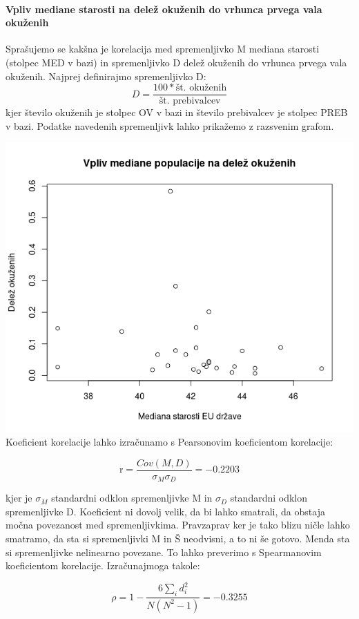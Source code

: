 \documentclass[a4paper,11pt]{article}
\begin{document}
\paragraph{Vpliv mediane starosti na delež okuženih do vrhunca prvega vala okuženih}
Sprašujemo se kakšna je korelacija med spremenljivko M mediana starosti (stolpec MED v bazi) in spremenljivko D delež okuženih do vrhunca prvega vala okuženih. Najprej definirajmo spremenljivko D:
\[D = \frac{100 * \text{št. okuženih}}{\text{št. prebivalcev}}\]
kjer število okuženih je stolpec OV v bazi in število prebivalcev je stolpec PREB v bazi. Podatke navedenih spremenljivk lahko prikažemo z razsvenim grafom.

\includegraphics[scale=0.6]{vpliv_med_pop_na_delez_okuzencev}
Koeficient korelacije lahko izračunamo s Pearsonovim koeficientom korelacije:

\begin{center}
\[\text{r} = \frac{Cov(M,D)}{\sigma_{M} \sigma_{D}} = -0.2203\]
\end{center} 
kjer je \(\sigma_{M}\) standardni odklon spremenljivke M in \(\sigma_{D}\) standardni odklon spremenljivke D. Koeficient ni dovolj velik, da bi lahko smatrali, da obstaja močna povezanost med spremenljivkima. Pravzaprav ker je tako blizu ničle lahko smatramo, da sta si spremenljivki M in Š neodvisni, a to ni še gotovo. Menda sta si spremenljivke nelinearno povezane. To lahko preverimo s Spearmanovim koeficientom korelacije. Izračunajmoga takole: 

\begin{center}
\[\rho = 1 - \frac{6\sum_{i}{}d_i^2}{N(N^2 - 1)} = -0.3255\]
\end{center} 
\end{document}
